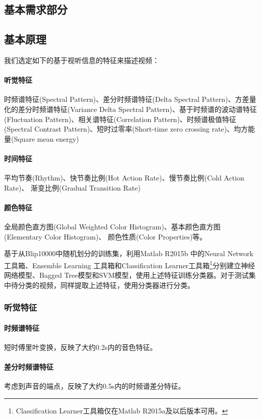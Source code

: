 \documentclass{article}
\begin{document}
\begin{multicols}{2}
    \section{基本需求部分}
        \subsection{基本原理}
            我们选定如下的基于视听信息的特征来描述视频\cite{webvideo}：
            \paragraph{听觉特征}
            时频谱特征(Spectral Pattern)、差分时频谱特征(Delta Spectral Pattern)、方差量化的差分时频谱特征(Variance Delta Spectral Pattern)、基于时频谱的波动谱特征(Fluctuation Pattern)、相关谱特征(Correlation Pattern)、时频谱极值特征(Spectral Contrast Pattern)、短时过零率(Short-time zero crossing rate)、均方能量(Square mean energy)
            \paragraph{时间特征}
            平均节奏(Rhythm)、快节奏比例(Hot Action Rate)、慢节奏比例(Cold Action Rate)、 渐变比例(Gradual Transition Rate)
            \paragraph{颜色特征}
            全局颜色直方图(Global Weighted Color Histogram)、基本颜色直方图(Elementary Color Histogram)、 颜色性质(Color Properties)等。

            基于从Blip10000中随机划分的训练集，利用Matlab R2015b 中的Neural Network工具箱、Ensemble Learning 工具箱和Classification Learner工具箱\footnote{Classification Learner工具箱仅在Matlab R2015a及以后版本可用。}分别建立神经网络模型、Bagged Tree模型和SVM模型，使用上述特征训练分类器。对于测试集中待分类的视频，同样提取上述特征，使用分类器进行分类。

            \subsubsection{听觉特征}
                \paragraph{时频谱特征}
                短时傅里叶变换，反映了大约0.2s内的音色特征。
                \paragraph{差分时频谱特征}
                考虑到声音的端点，反映了大约0.5s内的时频谱差分特征。

\end{multicols}
\end{document}
